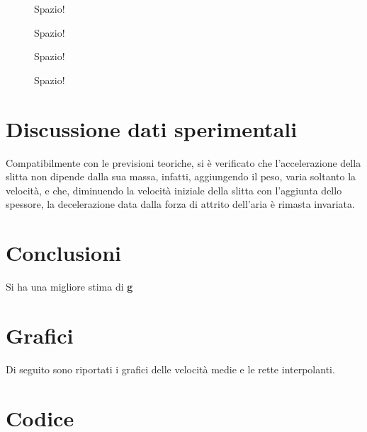 \documentclass[12pt]{article} %
\begin{document}
\begin{figure}[H]
    \centering

\caption{Spazio!}
\label{fig:spazio1}
\end{figure}

\begin{figure}[H]
    \centering

\caption{Spazio!}
\label{fig:spazio1}
\end{figure}

\begin{figure}[H]
    \centering

\caption{Spazio!}
\label{fig:spazio1}
\end{figure}

\begin{figure}[H]
    \centering

\caption{Spazio!}
\label{fig:spazio1}
\end{figure}


\section{Discussione dati sperimentali}
Compatibilmente con le previsioni teoriche, si è verificato che l'accelerazione della slitta non dipende dalla sua massa, infatti, aggiungendo il peso, varia soltanto la velocità, e che, diminuendo la velocità iniziale della slitta con l'aggiunta dello spessore, la decelerazione data dalla forza di attrito dell'aria è rimasta invariata.

\section{Conclusioni}
Si ha una migliore stima di \textbf{g}

\section {Grafici}
Di seguito sono riportati i grafici delle velocità medie e le rette interpolanti.
\subsection {}
%

\section{Codice}	
\end{document}
